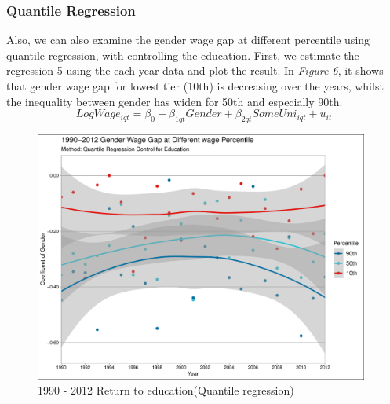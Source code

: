 \documentclass{article}
\begin{document}
\subsubsection{Quantile Regression}
Also, we can also examine the gender wage gap at different percentile using quantile regression, with controlling  the education. First, we estimate the regression 5 using the each year data and plot the result. In \textit{Figure 6}, it shows that gender wage gap for lowest tier (10th) is decreasing over the years, whilst the inequality between gender has widen for 50th and especially 90th.\\
\begin{equation}
    LogWage_{iqt}=\beta_0+\beta_{1qt}Gender+\beta_{2qt}SomeUni_{iqt}+u_{it}
\end{equation}

\begin{figure}[H]
    \centering
    \includegraphics[width=110mm,scale=0.9]{q7p3.pdf}
    \caption{1990 - 2012 Return to education(Quantile regression)}
    \label{fig:my_label}
\end{figure}
\end{document}
